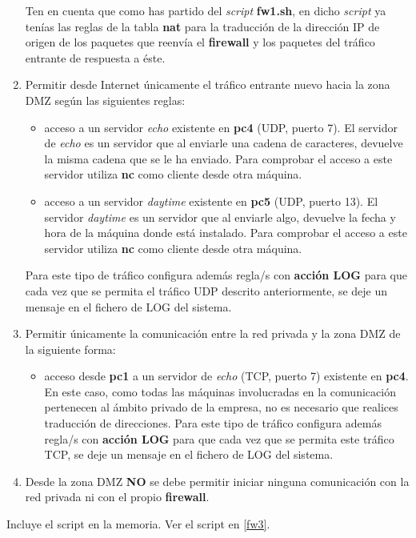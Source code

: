 \documentclass[12pt, a4paper]{report}
\begin{document}
\begin{enumerate}
	Ten en cuenta que como has partido del \textit{script} \textbf{fw1.sh}, en dicho \textit{script} ya tenías las reglas de la
	tabla \textbf{nat} para la traducción de la dirección IP de origen de los paquetes que reenvía el \textbf{firewall}
	y los paquetes del tráfico entrante de respuesta a éste.
	\item Permitir desde Internet únicamente el tráfico entrante nuevo hacia la zona DMZ según las siguientes reglas:
	\begin{itemize}
		\item acceso a un servidor \textit{echo} existente en \textbf{pc4} (UDP, puerto 7). El servidor de \textit{echo} es un servidor
		que al enviarle una cadena de caracteres, devuelve la misma cadena que se le ha enviado.
		Para comprobar el acceso a este servidor utiliza \textbf{nc} como cliente desde otra máquina.
		\item acceso a un servidor \textit{daytime} existente en \textbf{pc5} (UDP, puerto 13). El servidor \textit{daytime} es un
		servidor que al enviarle algo, devuelve la fecha y hora de la máquina donde está instalado.
		Para comprobar el acceso a este servidor utiliza \textbf{nc} como cliente desde otra máquina.
	\end{itemize}
	Para este tipo de tráfico configura además regla/s con \textbf{acción LOG} para que cada vez que se
	permita el tráfico UDP descrito anteriormente, se deje un mensaje en el fichero de LOG del
	sistema.
	\item Permitir únicamente la comunicación entre la red privada y la zona DMZ de la siguiente forma:
	\begin{itemize}
		\item acceso desde \textbf{pc1} a un servidor de \textit{echo} (TCP, puerto 7) existente en \textbf{pc4}. En este caso,
		como todas las máquinas involucradas en la comunicación pertenecen al ámbito privado de
		la empresa, no es necesario que realices traducción de direcciones. Para este tipo de tráfico
		configura además regla/s con \textbf{acción LOG} para que cada vez que se permita este tráfico
		TCP, se deje un mensaje en el fichero de LOG del sistema.
	\end{itemize}
	\item Desde la zona DMZ \textbf{NO} se debe permitir iniciar ninguna comunicación con la red privada ni con
	el propio \textbf{firewall}.
\end{enumerate}
Incluye el script en la memoria. Ver el script en \ref{fw3}.\\
\end{document}

